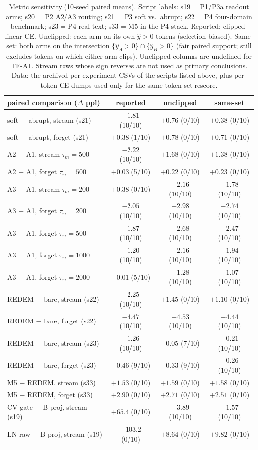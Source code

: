 \documentclass[preprint,12pt]{elsarticle}
\begin{document}
\begin{table}[t]
\centering
\scriptsize
\begin{tabular}{lccc}
\toprule
paired comparison ($\Delta$ ppl) & reported & unclipped & same-set \\
\midrule
soft $-$ abrupt, stream (s21) & $-1.81$ (10/10) & $+0.76$ (0/10) & $+0.38$ (0/10) \\
soft $-$ abrupt, forget (s21) & $+0.38$ (1/10) & $+0.78$ (0/10) & $+0.71$ (0/10) \\
A2 $-$ A1, stream $\tau_m{=}500$ & $-2.22$ (10/10) & $+1.68$ (0/10) & $+1.38$ (0/10) \\
A2 $-$ A1, forget $\tau_m{=}500$ & $+0.03$ (5/10) & $+0.22$ (0/10) & $+0.23$ (0/10) \\
A3 $-$ A1, stream $\tau_m{=}200$ & $+0.38$ (0/10) & $-2.16$ (10/10) & $-1.78$ (10/10) \\
A3 $-$ A1, forget $\tau_m{=}200$ & $-2.05$ (10/10) & $-2.98$ (10/10) & $-2.74$ (10/10) \\
A3 $-$ A1, forget $\tau_m{=}500$ & $-1.87$ (10/10) & $-2.68$ (10/10) & $-2.47$ (10/10) \\
A3 $-$ A1, forget $\tau_m{=}1000$ & $-1.20$ (10/10) & $-2.16$ (10/10) & $-1.94$ (10/10) \\
A3 $-$ A1, forget $\tau_m{=}2000$ & $-0.01$ (5/10) & $-1.28$ (10/10) & $-1.07$ (10/10) \\
REDEM $-$ bare, stream (s22) & $-2.25$ (10/10) & $+1.45$ (0/10) & $+1.10$ (0/10) \\
REDEM $-$ bare, forget (s22) & $-4.47$ (10/10) & $-4.53$ (10/10) & $-4.44$ (10/10) \\
REDEM $-$ bare, stream (s23) & $-1.26$ (10/10) & $-0.05$ (7/10) & $-0.21$ (10/10) \\
REDEM $-$ bare, forget (s23) & $-0.46$ (9/10) & $-0.33$ (9/10) & $-0.26$ (10/10) \\
M5 $-$ REDEM, stream (s33) & $+1.53$ (0/10) & $+1.59$ (0/10) & $+1.58$ (0/10) \\
M5 $-$ REDEM, forget (s33) & $+2.90$ (0/10) & $+2.71$ (0/10) & $+2.51$ (0/10) \\
CV-gate $-$ B-proj, stream (s19) & $+65.4$ (0/10) & $-3.89$ (10/10) & $-1.57$ (10/10) \\
LN-raw $-$ B-proj, stream (s19) & $+103.2$ (0/10) & $+8.64$ (0/10) & $+9.82$ (0/10) \\
\bottomrule
\end{tabular}
\caption{Metric sensitivity (10-seed paired means). Script labels:
s19 = P1/P3a readout arms; s20 = P2 A2/A3 routing; s21 = P3 soft vs.\
abrupt; s22 = P4 four-domain benchmark; s23 = P4 real-text; s33 = M5
in the P4 stack. Reported: clipped-linear
CE. Unclipped: each arm on its own $\hat y>0$ tokens (selection-biased).
Same-set: both arms on the intersection $\{\hat y_A>0\}\cap\{\hat y_B>0\}$
(fair paired support; still excludes tokens on which either arm clips).
Unclipped columns are undefined for TF-A1. Stream rows whose sign
reverses are not used as primary conclusions. Data: the archived
per-experiment CSVs of the scripts listed above, plus per-token
CE dumps used only for the same-token-set rescore.}
\label{tab:sens}
\end{table}
\end{document}
